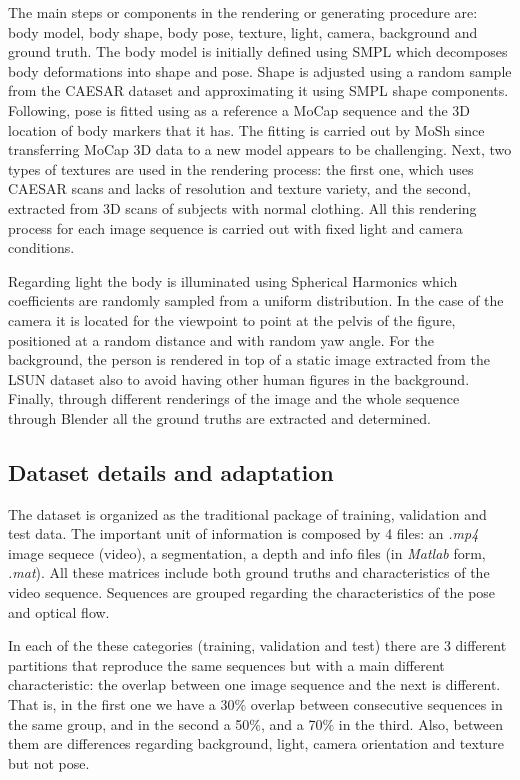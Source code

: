 \documentclass[12pt,a4paper]{article}
\begin{document}
The main steps or components in the rendering or generating procedure are: body model, body shape, body pose, texture, light, camera, background and ground truth. The body model is initially defined using SMPL which decomposes body deformations into shape and pose. Shape is adjusted using a random sample from the CAESAR dataset and approximating it using SMPL shape components. Following, pose is fitted using as a reference a MoCap sequence and the 3D location of body markers that it has. The fitting is carried out by MoSh since transferring MoCap 3D data to a new model appears to be challenging. Next, two types of textures are used in the rendering process: the first one, which uses CAESAR scans and lacks of resolution and texture variety, and the second, extracted from 3D scans of subjects with normal clothing. All this rendering process for each image sequence is carried out with fixed light and camera conditions.\newline 

Regarding light the body is illuminated using Spherical Harmonics which coefficients are randomly sampled from a uniform distribution. In the case of the camera it is located for the viewpoint  to point at the pelvis of the figure, positioned at a random distance and  with random yaw angle. For the background, the person is rendered in top of a static image extracted from the LSUN dataset also to avoid having other human figures in the background. Finally, through different renderings of the image and the whole sequence through Blender all the ground truths are extracted and determined.

\subsection{Dataset details and adaptation}

The dataset is organized as the traditional package of training, validation and test data. The important unit of information is composed by 4 files: an \textit{.mp4} image sequece (video), a segmentation, a depth and info files (in \textit{Matlab} form, \textit{.mat}). All these matrices include both ground truths and characteristics of the video sequence. Sequences are grouped regarding the characteristics of the pose and optical flow.\newline

In each of the these categories (training, validation and test) there are 3 different partitions that reproduce the same sequences but with a main different characteristic: the overlap between one image sequence and the next is different. That is, in the first one we have a 30$\%$ overlap between consecutive sequences in the same group, and in the second a 50$\%$, and a 70$\%$ in the third. Also, between them are differences regarding background, light, camera orientation and texture but not pose. \newline
\end{document}
